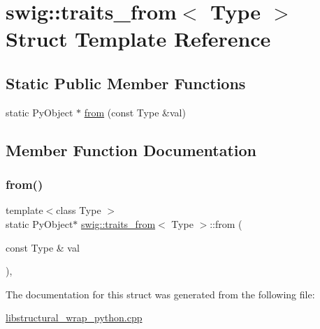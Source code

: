 \hypertarget{structswig_1_1traits__from}{}\section{swig\+:\+:traits\+\_\+from$<$ Type $>$ Struct Template Reference}
\label{structswig_1_1traits__from}
\subsection*{Static Public Member Functions}
\begin{DoxyCompactItemize}
\item 
static Py\+Object $\ast$ \hyperlink{structswig_1_1traits__from_a502976b6bea889bcc35d0aed72e8d901}{from} (const Type \&val)
\end{DoxyCompactItemize}


\subsection{Member Function Documentation}
\mbox{\label{structswig_1_1traits__from_a502976b6bea889bcc35d0aed72e8d901}} 
\subsubsection{\texorpdfstring{from()}{from()}}
{\footnotesize\ttfamily template$<$class Type $>$ \\
static Py\+Object$\ast$ \hyperlink{structswig_1_1traits__from}{swig\+::traits\+\_\+from}$<$ Type $>$\+::from (\begin{DoxyParamCaption}\item[{const Type \&}]{val }\end{DoxyParamCaption})\hspace{0.3cm}{\ttfamily [inline]}, {\ttfamily [static]}}



The documentation for this struct was generated from the following file\+:\begin{DoxyCompactItemize}
\item 
\hyperlink{libstructural__wrap__python_8cpp}{libstructural\+\_\+wrap\+\_\+python.\+cpp}\end{DoxyCompactItemize}
